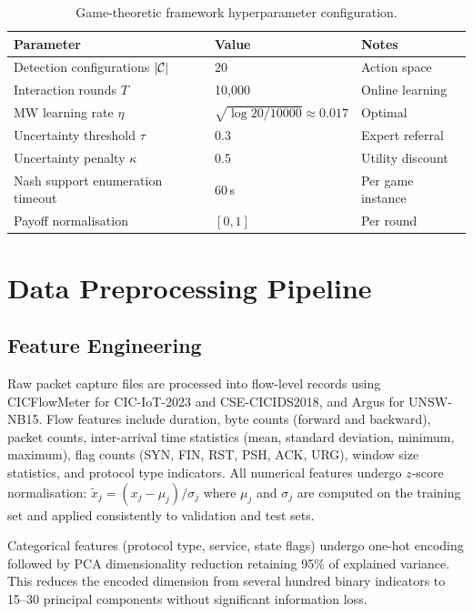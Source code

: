 \begin{table}[htbp]
\centering
\caption{Game-theoretic framework hyperparameter configuration.}
\label{tab:hp_game}
\begin{tabular}{lll}
\toprule
Parameter & Value & Notes \\
\midrule
Detection configurations $|\mathcal{C}|$ & 20 & Action space \\
Interaction rounds $T$     & 10{,}000 & Online learning \\
MW learning rate $\eta$    & $\sqrt{\log 20/10000}\approx0.017$ & Optimal \\
Uncertainty threshold $\tau$ & 0.3 & Expert referral \\
Uncertainty penalty $\kappa$ & 0.5 & Utility discount \\
Nash support enumeration timeout & 60\,s & Per game instance \\
Payoff normalisation       & $[0,1]$ & Per round \\
\bottomrule
\end{tabular}
\end{table}


\section{Data Preprocessing Pipeline}
\label{app:preprocessing}

\subsection{Feature Engineering}
\label{app:features}

Raw packet capture files are processed into flow-level records using CICFlowMeter for CIC-IoT-2023 and CSE-CICIDS2018, and Argus for UNSW-NB15. Flow features include duration, byte counts (forward and backward), packet counts, inter-arrival time statistics (mean, standard deviation, minimum, maximum), flag counts (SYN, FIN, RST, PSH, ACK, URG), window size statistics, and protocol type indicators. All numerical features undergo $z$-score normalisation: $\tilde{x}_j = (x_j-\mu_j)/\sigma_j$ where $\mu_j$ and $\sigma_j$ are computed on the training set and applied consistently to validation and test sets.

Categorical features (protocol type, service, state flags) undergo one-hot encoding followed by PCA dimensionality reduction retaining 95\% of explained variance. This reduces the encoded dimension from several hundred binary indicators to 15--30 principal components without significant information loss.


